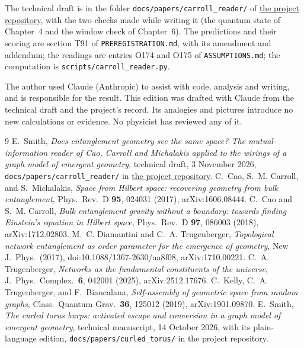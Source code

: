 \documentclass[11pt,letterpaper]{article}
\newcommand{\sub}[1]{\par\medskip{\color{ink}\large\bfseries #1}\par}
\begin{document}
\sub{Where the evidence is recorded}
The technical draft is in the folder \texttt{docs/papers/carroll\_reader/} of
\href{https://github.com/EmilySmithCreate/RecreationalPhysics}{the project repository}, with the two
checks made while writing it (the quantum state of Chapter~4 and the window check of Chapter~6). The
predictions and their scoring are section T91 of \texttt{PREREGISTRATION.md}, with its amendment and
addendum; the readings are entries O174 and O175 of \texttt{ASSUMPTIONS.md}; the computation is
\texttt{scripts/carroll\_reader.py}.

\sub{Disclosure}
The author used Claude (Anthropic) to assist with code, analysis and writing, and is responsible for the
result. This edition was drafted with Claude from the technical draft and the project's record. Its
analogies and pictures introduce no new calculations or evidence. No physicist has reviewed any of it.

\renewcommand{\refname}{Sources}
\begin{thebibliography}{9}\small
{} E.~Smith, \emph{Does entanglement geometry see the same space? The mutual-information
reader of Cao, Carroll and Michalakis applied to the wirings of a graph model of emergent geometry},
technical draft, 3 November 2026, \texttt{docs/papers/carroll\_reader/} in
\href{https://github.com/EmilySmithCreate/RecreationalPhysics}{the project repository}.
 C.~Cao, S.~M. Carroll, and S.~Michalakis, \emph{Space from Hilbert space: recovering
geometry from bulk entanglement}, Phys.\ Rev.\ D \textbf{95}, 024031 (2017), arXiv:1606.08444.
 C.~Cao and S.~M. Carroll, \emph{Bulk entanglement gravity without a boundary: towards
finding Einstein's equation in Hilbert space}, Phys.\ Rev.\ D \textbf{97}, 086003 (2018),
arXiv:1712.02803.
 M.~C. Diamantini and C.~A. Trugenberger, \emph{Topological network entanglement as order
parameter for the emergence of geometry}, New J.\ Phys.\ (2017), doi:10.1088/1367-2630/aa8f08,
arXiv:1710.00221.
 C.~A. Trugenberger, \emph{Networks as the fundamental constituents of the universe},
J.\ Phys.\ Complex.\ \textbf{6}, 042001 (2025), arXiv:2512.17676.
 C.~Kelly, C.~A. Trugenberger, and F.~Biancalana, \emph{Self-assembly of geometric space
from random graphs}, Class.\ Quantum Grav.\ \textbf{36}, 125012 (2019), arXiv:1901.09870.
 E.~Smith, \emph{The curled torus burps: activated escape and conversion in a graph model
of emergent geometry}, technical manuscript, 14 October 2026, with its plain-language edition,
\texttt{docs/papers/curled\_torus/} in the project repository.
\end{thebibliography}
\end{document}
